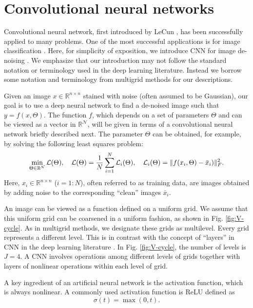 \section{Convolutional neural networks}\label{sc:cnn}
Convolutional neural network, first introduced by LeCun
\cite{lecun1998gradient}, has been successfully applied to many
problems.  One of the most successful applications is for image
classification
\cite{lecun1998gradient,krizhevsky2012imagenet,simonyan2014very,he2016deep}.
Here,  for simplicity of exposition, we introduce CNN for image
de-noising
\cite{NIPS2008_3506,bengio2013generalized,alain2014regularized,xie2012image,zhang2017beyond}.
We emphasize that our introduction may not follow the standard
notation or terminology used in the deep learning literature. Instead
we borrow some notation and terminology from multigrid methods
for our descriptions.

Given an image $x \in \mathbb{R}^{n\times n}$ stained with 
noise (often assumed to be Gaussian), our goal is to use a deep neural
network to find a de-noised image such that $ y=f(x, \Theta) $.  The
function $f$, which depends on a set of parameters $\Theta$ and can be
viewed as a vector in $\mathbb R^{\mathcal N}$, will be given
in terms of a convolutional neural network  briefly described
next.  The parameter $\Theta$ can be obtained, for example, by
solving the following least squares problem:
\begin{equation}  \label{min-LSQ}
\min_{\Theta\in\mathbb R^{\mathcal N}}\mathcal L(\Theta), \quad
\mathcal L(\Theta)={1\over N}\sum_{i=1}^N \mathcal L_i(\Theta),
\quad \mathcal L_i(\Theta)=
\|f(x_i,\Theta)-\bar x_i)\|_{F}^2.
\end{equation}
Here, $x_i \in \mathbb{R}^{n\times n}$ ($i=1:N$), often referred to as training
data, are images obtained by adding noise to the corresponding
``clean'' images $\bar x_i$.

An image can be viewed as a function defined on a uniform grid.  We
assume that this uniform grid can be coarsened in a uniform fashion,
as shown in Fig. \ref{fig:V-cycle}.  As in multigrid methods, we
designate these grids as multilevel.  Every grid
represents a different level.  This is in contrast with the concept of
``layers'' in CNN in the deep learning literature
\cite{goodfellow2017deep}.  In Fig. \ref{fig:V-cycle}, the number of
levels is $J=4$. A CNN involves operations among different levels of
grids together with layers of nonlinear operations within each level
of grid.

A key ingredient of an artificial neural network is the 
activation function, which is always nonlinear.  A commonly used
activation function is ReLU defined as
\begin{equation}
\label{ReLU}
\sigma(t)=\max(0,t).
\end{equation}

